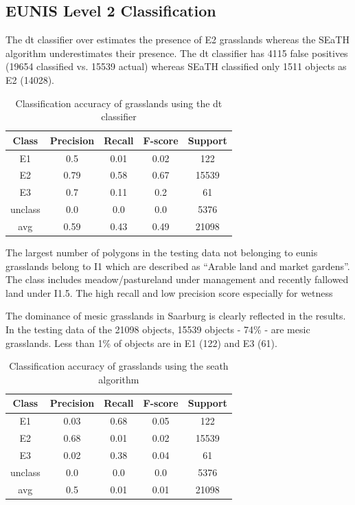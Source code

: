 \documentclass[authoryear,review,12pt,number]{elsarticle}
\begin{document}
\subsection{EUNIS Level 2 Classification}
\label{subsec:level2_classification}
The \gls{dt} classifier over estimates the presence of E2 grasslands whereas 
the SEaTH
algorithm underestimates their presence. The \gls{dt} classifier has 4115 false
positives (19654 classified vs. 15539 actual) whereas SEaTH classified only 1511
objects as E2 (14028). %
\begin{table}
\centering
\begin{tabular}{c c c c c}
Class & Precision & Recall & F-score & Support\\
\hline
E1 & 0.5 & 0.01 & 0.02 & 122\\
E2 & 0.79 & 0.58 & 0.67 & 15539\\
E3 & 0.7 & 0.11 & 0.2 & 61\\
unclass & 0.0 & 0.0 & 0.0 & 5376\\
avg & 0.59 & 0.43 & 0.49 & 21098\\
\end{tabular}
\caption{Classification accuracy of grasslands using the \gls{dt} 
classifier\label{fig:dt_lvl2_classification}}
\end{table}
The largest number of polygons in the testing data not belonging to \gls{eunis}
grasslands belong to I1 which are described as ``Arable land and
market gardens''. The class includes meadow/pastureland under management and
recently fallowed land under I1.5. The high recall and low precision score
especially for wetness 

The dominance of mesic grasslands in Saarburg is clearly reflected in
the results. In the testing data of the 21098 objects, 15539 objects - 74\% -
are mesic grasslands. Less than 1\% of objects are in E1 (122) and E3 (61). 
\begin{table}
\centering
\begin{tabular}{c c c c c}
Class & Precision & Recall & F-score & Support\\
\hline
E1 & 0.03 & 0.68 & 0.05 & 122\\
E2 & 0.68 & 0.01 & 0.02 & 15539\\
E3 & 0.02 & 0.38 & 0.04 & 61\\
unclass & 0.0 & 0.0 & 0.0 & 5376\\
avg & 0.5 & 0.01 & 0.01 & 21098\\
\end{tabular}
\caption{Classification accuracy of grasslands using the \gls{seath}
algorithm\label{fig:seath_lvl2_classification}}
\end{table}
\end{document}
